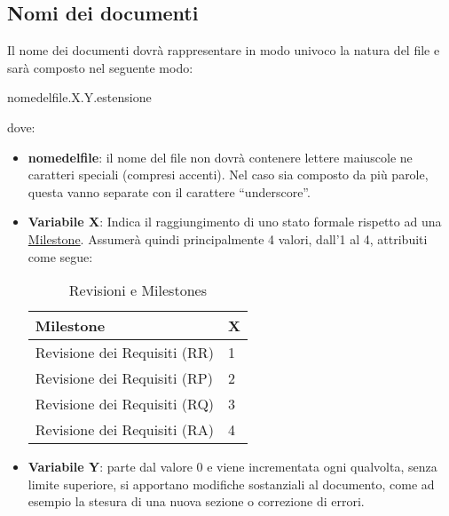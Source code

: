 \subsection{Nomi dei documenti}
\label{sec:nomi_documenti}
Il nome dei documenti dovrà rappresentare in modo univoco la natura del file e sarà composto nel seguente modo:
\begin{center}
nome\textunderscore del\textunderscore file.X.Y.estensione
\end{center}
dove:
\begin{itemize}
\item \textbf{nome\textunderscore del\textunderscore file}: il nome del file non dovrà contenere lettere maiuscole ne caratteri speciali (compresi accenti). Nel caso sia composto da più parole, questa vanno separate con il carattere ``underscore''.
\item \textbf{Variabile X}: Indica il raggiungimento di uno stato formale rispetto ad una \underline{Milestone}. Assumerà quindi principalmente 4 valori, dall'1 al 4, attribuiti come segue:
\begin{table}[h]
\centering
\begin{tabular}{l|l}
\toprule
Milestone & X\\
\midrule
Revisione dei Requisiti (RR) & 1\\
Revisione dei Requisiti (RP) & 2\\
Revisione dei Requisiti (RQ) & 3\\
Revisione dei Requisiti (RA) & 4\\
\bottomrule
\end{tabular}
\caption{Revisioni e Milestones}
\end{table}
\item \textbf{Variabile Y}: parte dal valore 0 e viene incrementata ogni qualvolta, senza limite superiore, si apportano modifiche sostanziali al documento, come ad esempio la stesura di una nuova sezione o correzione di errori.
\end{itemize}

